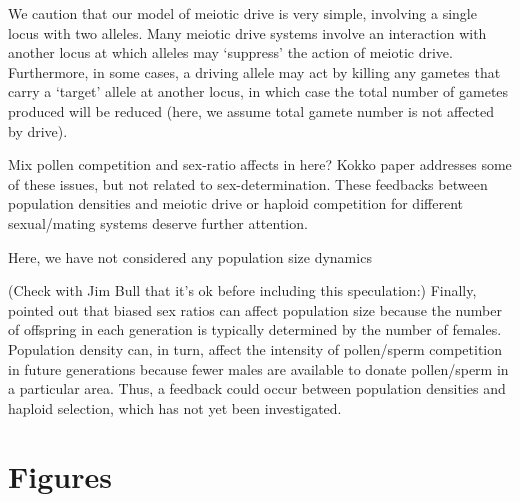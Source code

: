 \documentclass[12pt]{article}
\begin{document}
We caution that our model of meiotic drive is very simple, involving a single locus with two alleles. 
Many meiotic drive systems involve an interaction with another locus at which alleles may `suppress' the action of meiotic drive. 
Furthermore, in some cases, a driving allele may act by killing any gametes that carry a `target' allele at another locus, in which case the total number of gametes produced will be reduced (here, we assume total gamete number is not affected by drive). 

Mix pollen competition and sex-ratio affects in here?
Kokko paper addresses some of these issues, but not related to sex-determination. 
These feedbacks between population densities and meiotic drive or haploid competition for different sexual/mating systems deserve further attention. 

Here, we have not considered any population size dynamics 

{\color{blue}
(Check with Jim Bull that it's ok before including this speculation:)
Finally, \citet{Hamilton:1967ts} pointed out that biased sex ratios can affect population size because the number of offspring in each generation is typically determined by the number of females. 
Population density can, in turn, affect the intensity of pollen/sperm competition in future generations because fewer males are available to donate pollen/sperm in a particular area. 
Thus, a feedback could occur between population densities and haploid selection, which has not yet been investigated. 
}




\newpage
\section*{Figures}
\end{document}
